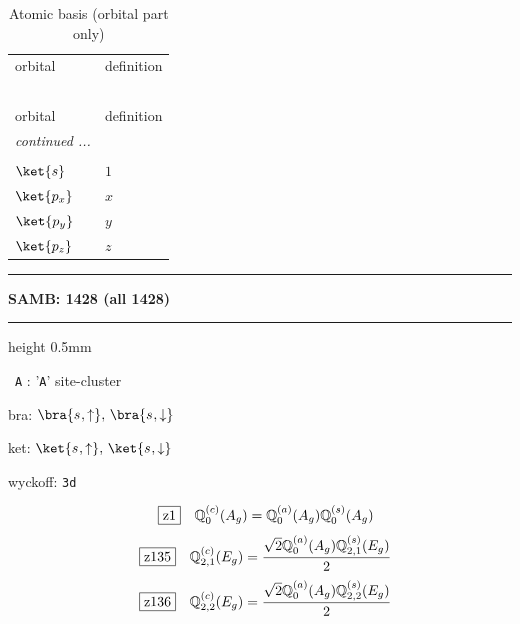 \documentclass[fleqn,10pt,landscape]{jsarticle}
\begin{document}
\renewcommand{\arraystretch}{1.6}
\begin{longtable}[l]{ll}
\captionsetup{justification=raggedright, singlelinecheck=off}
\caption{Atomic basis (orbital part only)}
 \\
 \hline \hline
orbital & definition \\ \hline \endfirsthead

\multicolumn{1}{l}{\tablename\ \thetable{}} \\
 \hline \hline
orbital & definition \\ \hline \endhead

 \hline \hline
\multicolumn{1}{r}{\footnotesize\it continued ...} \\ \endfoot

 \hline \hline
\multicolumn{1}{r}{} \\ \endlastfoot

$ \ket{s} $ & $ 1 $ \\ \hline
$ \ket{p_{x}} $ & $ x $ \\
$ \ket{p_{y}} $ & $ y $ \\
$ \ket{p_{z}} $ & $ z $ \\
\end{longtable}
\vspace{5mm}
\noindent \rule[0.5mm]{5mm}{0.5mm}\hspace{3mm}\textbf{SAMB: 1428 (all 1428)}\hspace{3mm}\leaders\hrule height 0.5mm\hfill\kern0pt
\vspace{3mm}

\vspace{5mm}

\noindent\textbullet\, \texttt{A} : '\texttt{A}' site-cluster

\noindent\quad * bra: $\bra{s_{},\uparrow},\, \bra{s_{},\downarrow}$

\noindent\quad * ket: $\ket{s_{},\uparrow},\, \ket{s_{},\downarrow}$

\noindent\quad * wyckoff: \texttt{3d}

\begin{dmath*}
\hspace*{3mm}\fbox{z1}\quad \mathbb{Q}_{0}^{(c)}(A_{g})=\mathbb{Q}_{0}^{(a)}(A_{g}) \mathbb{Q}_{0}^{(s)}(A_{g})
\end{dmath*}
\begin{dmath*}
\hspace*{3mm}\fbox{z135}\quad \mathbb{Q}_{2,1}^{(c)}(E_{g})=\frac{\sqrt{2} \mathbb{Q}_{0}^{(a)}(A_{g}) \mathbb{Q}_{2,1}^{(s)}(E_{g})}{2}
\end{dmath*}
\begin{dmath*}
\hspace*{3mm}\fbox{z136}\quad \mathbb{Q}_{2,2}^{(c)}(E_{g})=\frac{\sqrt{2} \mathbb{Q}_{0}^{(a)}(A_{g}) \mathbb{Q}_{2,2}^{(s)}(E_{g})}{2}
\end{dmath*}
\vspace{5mm}
\end{document}
